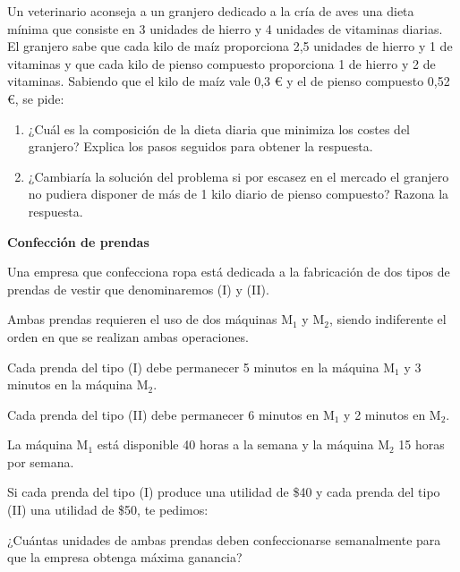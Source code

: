 \begin{Ejer}
Un veterinario aconseja a un granjero dedicado a la cr\'ia de aves una dieta m\'inima que consiste en 3 unidades de hierro y 4 unidades de vitaminas diarias. El granjero sabe que cada kilo de ma\'iz proporciona 2,5 unidades de hierro y 1 de vitaminas y que cada kilo de pienso compuesto proporciona 1 de hierro y 2 de vitaminas. Sabiendo que el kilo de ma\'iz vale 0,3 € y el de pienso compuesto 0,52 €, se pide:

\begin{enumerate}
\item ¿Cu\'al es la composici\'on de la dieta diaria que minimiza los costes del granjero? Explica los pasos seguidos para obtener la respuesta.
\item ¿Cambiar\'ia la soluci\'on del problema si por escasez en el mercado el granjero no pudiera disponer de m\'as de 1 kilo diario de pienso compuesto? Razona la respuesta.
\end{enumerate}
\end{Ejer}

\begin{Ejer} \textbf{Confecci\'on de prendas}

Una empresa que confecciona ropa est\'a dedicada a la fabricaci\'on de dos tipos de prendas de vestir que denominaremos (I) y (II).

Ambas prendas requieren el uso de dos m\'aquinas M$_1$ y M$_2$, siendo indiferente el orden en que se realizan ambas operaciones.

Cada prenda del tipo (I) debe permanecer 5 minutos en la m\'aquina M$_1$ y 3 minutos en la m\'aquina M$_2$.

Cada prenda del tipo (II) debe permanecer 6 minutos en M$_1$ y 2 minutos en M$_2$.

La m\'aquina M$_1$ est\'a disponible 40 horas a la semana y la m\'aquina M$_2$ 15 horas por semana.

Si cada prenda del tipo (I) produce una utilidad de \$40 y cada prenda del tipo (II) una utilidad de \$50, te pedimos:

¿Cu\'antas unidades de ambas prendas deben confeccionarse semanalmente para que la empresa obtenga m\'axima ganancia?
\end{Ejer}


